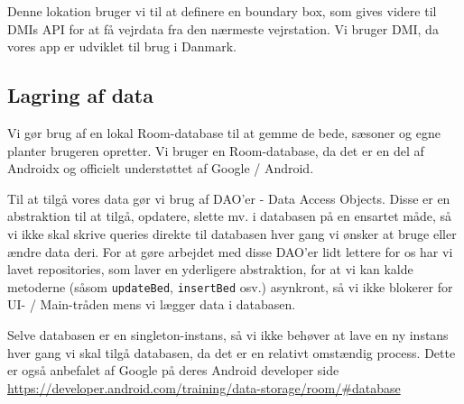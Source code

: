 Denne lokation bruger vi til at definere en boundary box, som gives videre til DMIs API for at få vejrdata fra den nærmeste vejrstation. Vi bruger DMI, da vores app er udviklet til brug i Danmark. 

\subsection{Lagring af data}
Vi gør brug af en lokal Room-database til at gemme de bede, sæsoner og egne planter brugeren opretter. Vi bruger en Room-database, da det er en del af Androidx og officielt understøttet af Google / Android. 

Til at tilgå vores data gør vi brug af DAO'er - Data Access Objects. Disse er en abstraktion til at tilgå, opdatere, slette mv. i databasen på en ensartet måde, så vi ikke skal skrive queries direkte til databasen hver gang vi ønsker at bruge eller ændre data deri.
For at gøre arbejdet med disse DAO'er lidt lettere for os har vi lavet repositories, som laver en yderligere abstraktion, for at vi kan kalde metoderne (såsom \texttt{updateBed}, \texttt{insertBed} osv.) asynkront, så vi ikke blokerer for UI- / Main-tråden mens vi lægger data i databasen.

Selve databasen er en singleton-instans, så vi ikke behøver at lave en ny instans hver gang vi skal tilgå databasen, da det er en relativt omstændig process. Dette er også anbefalet af Google på deres Android developer side \hyperlink{https://developer.android.com/training/data-storage/room/#database}{https://developer.android.com/training/data-storage/room/#database}
